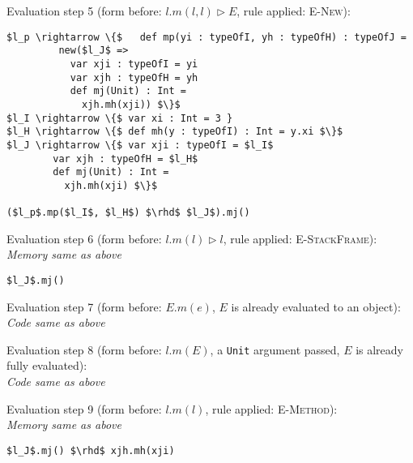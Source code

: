 \documentclass{llncs}
\begin{document}
\vspace{12pt}
\noindent Evaluation step 5 (form before: $l.m(l, l) \rhd E$, rule applied: \textsc{E-New}):
\vspace{-6pt}
\begin{lstlisting}[xleftmargin=20pt]
$l_p \rightarrow \{$   def mp(yi : typeOfI, yh : typeOfH) : typeOfJ =
         new($l_J$ =>
           var xji : typeOfI = yi
           var xjh : typeOfH = yh
           def mj(Unit) : Int =
             xjh.mh(xji)) $\}$
$l_I \rightarrow \{$ var xi : Int = 3 }
$l_H \rightarrow \{$ def mh(y : typeOfI) : Int = y.xi $\}$
$l_J \rightarrow \{$ var xji : typeOfI = $l_I$
        var xjh : typeOfH = $l_H$
        def mj(Unit) : Int =
          xjh.mh(xji) $\}$

($l_p$.mp($l_I$, $l_H$) $\rhd$ $l_J$).mj()
\end{lstlisting}

\vspace{12pt}
\noindent Evaluation step 6 (form before: $l.m(l) \rhd l$, rule applied: \textsc{E-StackFrame}):\\
\vspace{-6pt}
\indent\textit{Memory same as above}\\
\vspace{-6pt}
\begin{lstlisting}[xleftmargin=20pt]
$l_J$.mj()
\end{lstlisting}

\vspace{12pt}
\noindent Evaluation step 7 (form before: $E.m(e)$, $E$ is already evaluated to an object):\\
\indent\textit{Code same as above}

\vspace{12pt}
\noindent Evaluation step 8 (form before: $l.m(E)$, a \lstinline{Unit} argument passed, $E$ is already fully evaluated):\\
\indent\textit{Code same as above}

\vspace{12pt}
\noindent Evaluation step 9 (form before: $l.m(l)$, rule applied: \textsc{E-Method}):\\
\vspace{-6pt}
\indent\textit{Memory same as above}\\
\vspace{-6pt}
\begin{lstlisting}[xleftmargin=20pt]
$l_J$.mj() $\rhd$ xjh.mh(xji)
\end{lstlisting}
\end{document}
